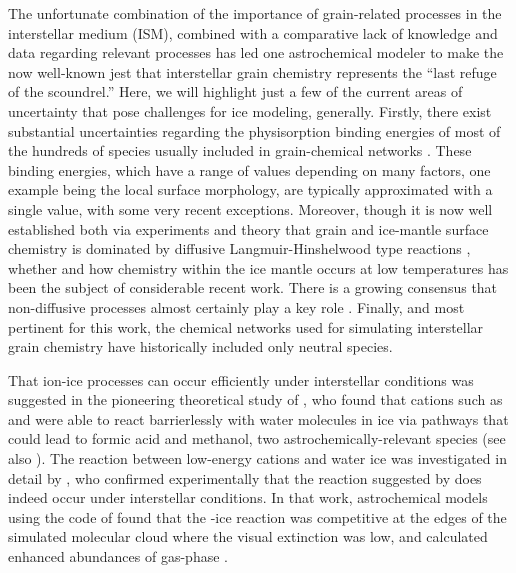 \documentclass[journal=aesccq,manuscript=article,layout=twocolumn]{achemso}
\begin{document}
The unfortunate combination of the importance of grain-related processes in the interstellar medium (ISM), combined with a comparative lack of knowledge and data regarding relevant processes has led one astrochemical modeler to make the now well-known jest that interstellar grain chemistry represents the ``last refuge of the scoundrel\citep{charnley_molecular_1992}.''  Here, we will highlight just a few of the current areas of uncertainty that pose challenges for ice modeling, generally.  Firstly, there exist substantial uncertainties regarding the physisorption binding energies of most of the hundreds of species usually included in grain-chemical networks \citep{cuppen_modelling_2011,lamberts_influence_2017,wakelam_binding_2017}. These binding energies, which have a range of values depending on many factors, one example being the local surface morphology, are typically approximated with a single value, with some very recent exceptions\citep{grassi_novel_2020,furuya_framework_2024}.  Moreover, though it is now well established both via experiments and theory that grain and ice-mantle surface chemistry is dominated by diffusive Langmuir-Hinshelwood type reactions \citep{qasim_experimental_2020,ioppolo_non-energetic_2020,cuppen_grain_2017,watanabe_efficient_2002}, whether and how chemistry within the ice mantle occurs at low temperatures has been the subject of considerable recent work. There is a growing consensus that non-diffusive processes almost certainly play a key role \citep{theule_thermal_2013,ghesquiere_diffusion_2015,shingledecker_simulating_2019, mullikin_condensed-phase_2018,jin_formation_2020,ioppolo_non-energetic_2021}.  Finally, and most pertinent for this work, the chemical networks used for simulating interstellar grain chemistry have historically included only neutral species.

That ion-ice processes can occur efficiently under interstellar conditions was suggested in the pioneering theoretical study of \citet{woon_ion-ice_2011}, who found that cations such as  and  were able to react barrierlessly with water molecules in ice via pathways that could lead to formic acid and methanol, two astrochemically-relevant species (see also \citet{woon_quantum_2021}).  The reaction between low-energy  cations and water ice was investigated in detail by \citet{nakai_methanol_2023}, who confirmed experimentally that the reaction suggested by \citet{woon_ion-ice_2011} does indeed occur under interstellar conditions.  In that work, astrochemical models using the code of \citet{furuya_water_2015} found that the -ice reaction was competitive at the edges of the simulated molecular cloud where the visual extinction was low, and calculated enhanced abundances of gas-phase . 
\end{document}

